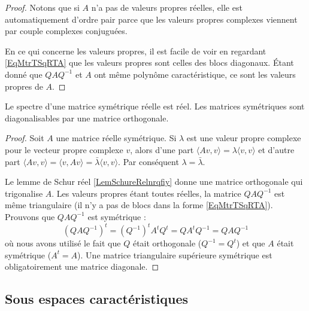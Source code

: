 \begin{proof}
    Notons que si \( A\) n'a pas de valeurs propres réelles, elle est automatiquement d'ordre pair parce que les valeurs propres complexes viennent par couple complexes conjuguées.

    En ce qui concerne les valeurs propres, il est facile de voir en regardant \eqref{EqMtrTSqRTA} que les valeurs propres sont celles des blocs diagonaux. Étant donné que \( QAQ^{-1}\) et \( A\) ont même polynôme caractéristique, ce sont les valeurs propres de \( A\).
\end{proof}

\begin{theorem} \label{ThoeTMXla}
    Le spectre d'une matrice symétrique réelle est réel. Les matrices symétriques sont diagonalisables par une matrice orthogonale.
\end{theorem}

\begin{proof}
    Soit \( A\) une matrice réelle symétrique. Si \( \lambda\) est une valeur propre complexe pour le vecteur propre complexe \( v\), alors d'une part \( \langle Av, v\rangle =\lambda\langle v, v\rangle \) et d'autre part \( \langle Av, v\rangle =\langle v, Av\rangle =\bar\lambda\langle v, v\rangle \). Par conséquent \( \lambda=\bar\lambda\).
    
    Le lemme de Schur réel \ref{LemSchureRelnrqfiy} donne une matrice orthogonale qui trigonalise \( A\). Les valeurs propres étant toutes réelles, la matrice \( QAQ^{-1}\) est même triangulaire (il n'y a pas de blocs dans la forme \eqref{EqMtrTSqRTA}). Prouvons que \( QAQ^{-1}\) est symétrique :
    \begin{equation}
        (QAQ^{-1})^t=(Q^{-1})^tA^tQ^t=QA^tQ^{-1}=QAQ^{-1}
    \end{equation}
    où nous avons utilisé le fait que \( Q\) était orthogonale (\( Q^{-1}=Q^t\)) et que \( A\) était symétrique (\( A^t=A\)). Une matrice triangulaire supérieure symétrique est obligatoirement une matrice diagonale.
\end{proof}

\subsection{Sous espaces caractéristiques}

